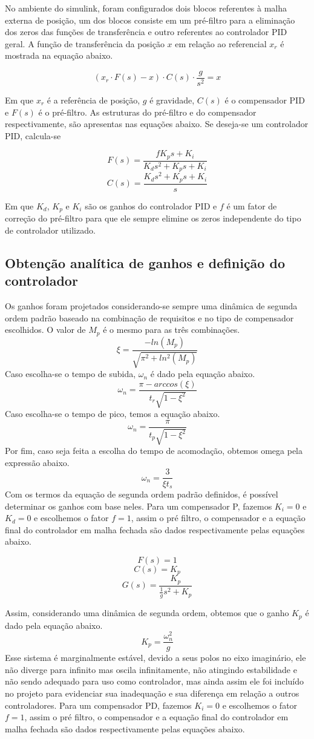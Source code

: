 \documentclass[a4paper, 12pt]{article}
\begin{document}
No ambiente do simulink, foram configurados dois blocos referentes à malha externa de posição, um dos blocos consiste em um pré-filtro para a eliminação dos zeros das funções de transferência e outro referentes ao controlador PID geral. A função de transferência da posição $x$ em relação ao referencial $x_r$ é mostrada na equação abaixo.

\[(x_r\cdot F(s)-x)\cdot C(s)\cdot\frac{g}{s^2}=x\]

Em que $x_r$ é a referência de posição, $g$ é gravidade, $C(s)$ é o compensador PID e $F(s)$ é o pré-filtro. As estruturas do pré-filtro e do compensador respectivamente, são apresentas nas equações abaixo. Se deseja-se um controlador PID, calcula-se

\[F(s) = \frac{fK_ps+K_i}{K_ds^2+K_ps+K_i}\]
\[C(s)=\frac{K_ds^2+K_ps+K_i}{s}\]

Em que $K_d$, $K_p$ e $K_i$ são os ganhos do controlador PID e $f$ é um fator de correção do pré-filtro para que ele sempre elimine os zeros independente do tipo de controlador utilizado.

\subsection{Obtenção analítica de ganhos e definição do controlador}

Os ganhos foram projetados considerando-se sempre uma dinâmica de segunda ordem padrão baseado na combinação de requisitos e no tipo de compensador escolhidos. O valor de $M_p$ é o mesmo para as três combinações.
\[\xi = \frac{-ln(M_p)}{\sqrt{\pi^2+ln^2(M_p)}}\]
Caso escolha-se o tempo de subida, $\omega_n$ é dado pela equação abaixo.
\[\omega_n=\frac{\pi-arccos(\xi)}{t_r\sqrt{1-\xi^2}}\]
Caso escolha-se o tempo de pico, temos a equação abaixo.
\[\omega_n=\frac{\pi}{t_p\sqrt{1-\xi^2}}\]
Por fim, caso seja feita a escolha do tempo de acomodação, obtemos omega pela expressão abaixo.
\[\omega_n=\frac{3}{\xi t_s}\]
Com os termos da equação de segunda ordem padrão definidos, é possível determinar os ganhos com base neles. Para um compensador P, fazemos $K_i=0$ e $K_d=0$ e escolhemos o fator $f=1$, assim o pré filtro, o compensador e a equação final do controlador em malha fechada são dados respectivamente pelas equações abaixo.

\[F(s)=1\]
\[C(s)=K_p\]
\[G(s)=\frac{K_p}{\frac{1}{g}s^2+K_p}\]

Assim, considerando uma dinâmica de segunda ordem, obtemos que o ganho $K_p$ é dado pela equação abaixo.
\[K_p=\frac{\omega_n^2}{g}\]
Esse sistema é marginalmente estável, devido a seus polos no eixo imaginário, ele não diverge para infinito mas oscila infinitamente, não atingindo estabilidade e não sendo adequado para uso como controlador, mas ainda assim ele foi incluído no projeto para evidenciar sua inadequação e sua diferença em relação a outros controladores. Para um compensador PD, fazemos $K_i=0$ e escolhemos o fator $f=1$, assim o pré filtro, o compensador e a equação final do controlador em malha fechada são dados respectivamente pelas equações abaixo.
\end{document}
